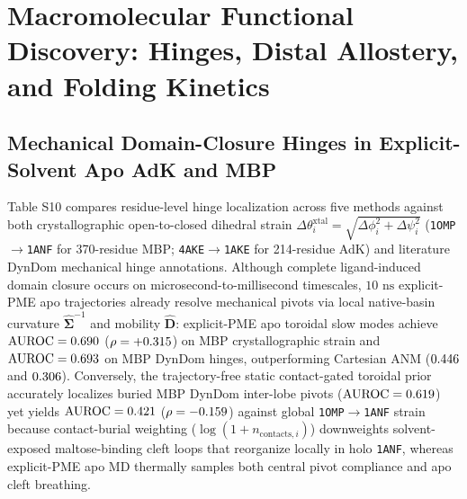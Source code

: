 \documentclass[10pt,letterpaper]{article}
\begin{document}
\clearpage
\section{Macromolecular Functional Discovery: Hinges, Distal Allostery, and Folding Kinetics}

\subsection{Mechanical Domain-Closure Hinges in Explicit-Solvent Apo AdK and MBP}
Table S10 compares residue-level hinge localization across five methods against both crystallographic open-to-closed dihedral strain $\Delta\theta_i^{\mathrm{xtal}} = \sqrt{\Delta\phi_i^2 + \Delta\psi_i^2}$ (\texttt{1OMP}$\to$\texttt{1ANF} for 370-residue MBP; \texttt{4AKE}$\to$\texttt{1AKE} for 214-residue AdK) and literature DynDom mechanical hinge annotations. Although complete ligand-induced domain closure occurs on microsecond-to-millisecond timescales, $10\text{ ns}$ explicit-PME apo trajectories already resolve mechanical pivots via local native-basin curvature $\hat{\bm{\Sigma}}^{-1}$ and mobility $\hat{\mathbf{D}}$: explicit-PME apo toroidal slow modes achieve $\mathrm{AUROC} = 0.690{}$ ($\rho = +0.315{}$) on MBP crystallographic strain and $\mathrm{AUROC} = 0.693{}$ on MBP DynDom hinges, outperforming Cartesian ANM ($0.446{}$ and $0.306{}$). Conversely, the trajectory-free static contact-gated toroidal prior accurately localizes buried MBP DynDom inter-lobe pivots ($\mathrm{AUROC} = 0.619{}$) yet yields $\mathrm{AUROC} = 0.421{}$ ($\rho = -0.159{}$) against global \texttt{1OMP}$\to$\texttt{1ANF} strain because contact-burial weighting ($\log(1 + n_{\mathrm{contacts},i})$) downweights solvent-exposed maltose-binding cleft loops that reorganize locally in holo \texttt{1ANF}, whereas explicit-PME apo MD thermally samples both central pivot compliance and apo cleft breathing.
\end{document}
